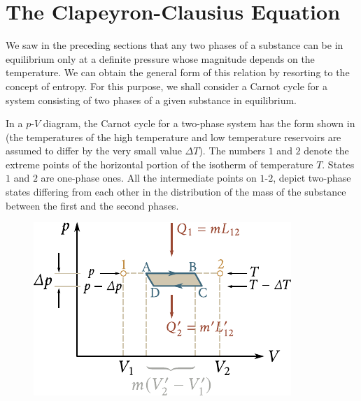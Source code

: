 \section{The Clapeyron-Clausius Equation}\label{sec:15_7}

We saw in the preceding sections that any two phases of a substance can be in equilibrium only at a definite pressure whose magnitude depends on the temperature. We can obtain the general form of this relation by resorting to the concept of entropy. For this purpose, we shall consider a Carnot cycle for a system consisting of two phases of a given substance in equilibrium.

In a $p$-$V$ diagram, the Carnot cycle for a two-phase system has the form shown in  (the temperatures of the high temperature and
low temperature reservoirs are assumed to differ by the very small value $\Delta T$). The numbers $1$ and $2$ denote the extreme points of the horizontal portion of the isotherm of temperature $T$. States $1$ and $2$ are one-phase ones. All the intermediate points on $1$-$2$, depict two-phase states differing from each other in the distribution of the mass of the substance between the first and the second phases.

\begin{figure}[t]
	\begin{center}
		\includegraphics[scale=1]{figures/ch_15/fig_15_15.pdf}
		\caption[]{}
		\label{fig:15_15}
	\end{center}
	\vspace{-0.8cm}
\end{figure}

